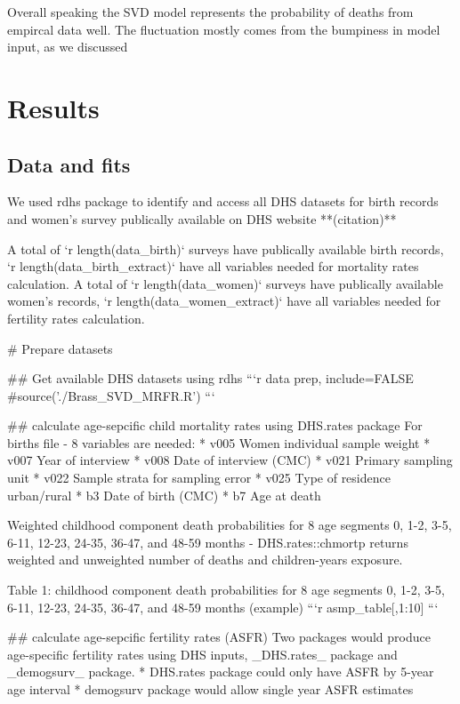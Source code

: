 \documentclass[11pt,letterpaper]{article}
\begin{document}
Overall speaking the SVD model represents the probability of deaths from empircal data well. The fluctuation mostly comes from the bumpiness in model input, as we discussed 
\section{Results}

\subsection*{Data and fits}
We used rdhs package to identify and access all DHS datasets for birth records and women's survey publically available on DHS website **(citation)**

A total of `r length(data_birth)` surveys have publically available birth records, `r length(data_birth_extract)` have all variables needed for mortality rates calculation.  
A total of `r length(data_women)` surveys have publically available women's records, `r length(data_women_extract)` have all variables needed for fertility rates calculation.  


# Prepare datasets 

## Get available DHS datasets using rdhs
```{r data prep, include=FALSE}
#source('./Brass_SVD_MRFR.R')
```

## calculate age-sepcific child mortality rates using DHS.rates package  
For births file - 8 variables are needed:  
* v005 Women individual sample weight
* v007 Year of interview
* v008 Date of interview (CMC)
* v021 Primary sampling unit
* v022 Sample strata for sampling error
* v025 Type of residence urban/rural
* b3 Date of birth (CMC)
* b7 Age at death

Weighted childhood component death probabilities for 8 age segments 0, 1-2, 3-5,
6-11, 12-23, 24-35, 36-47, and 48-59 months 
  - DHS.rates::chmortp returns weighted and unweighted number of deaths and children-years exposure.

Table 1: childhood component death probabilities for 8 age segments 0, 1-2, 3-5,
6-11, 12-23, 24-35, 36-47, and 48-59 months (example)  
```{r}
asmp_table[,1:10]
```

## calculate age-sepcific fertility rates (ASFR)   
Two packages would produce age-specific fertility rates using DHS inputs, _DHS.rates_ package and _demogsurv_ package. 
* DHS.rates package could only have ASFR by 5-year age interval  
* demogsurv package would allow single year ASFR estimates  
\end{document}
